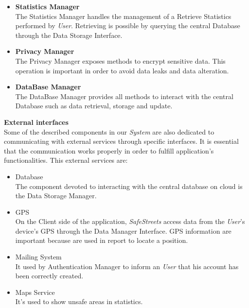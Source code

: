 \documentclass{article}
\begin{document}
\begin{itemize}
    \item \textbf{Statistics Manager} \\
    The Statistics Manager handles the management of a Retrieve Statistics performed by \textit{User}. Retrieving 
    is possible by querying the central Database through the Data Storage Interface.     
    \item \textbf{Privacy Manager} \\
    The Privacy Manager exposes methods to encrypt sensitive data. This operation is important in order to avoid data leaks
    and data alteration.
    \item \textbf{DataBase Manager} \\
    The DataBase Manager provides all methods to interact with the central Database such as data retrieval, 
    storage and update.
    
\end{itemize}

\textbf{External interfaces} \\
Some of the described components in our \textit{System} are also dedicated to communicating with external services through 
specific interfaces. It is essential that the communication works properly in order to fulfill application's functionalities.
This external services are:
\begin{itemize}
    \item Database \\
    The component devoted to interacting with the central database on cloud is the Data Storage Manager.
    \item GPS \\
    On the Client side of the application, \textit{SafeStreets} access data from the \textit{User}'s device's GPS through
    the Data Manager Interface. GPS information are important because are used in report to locate a position. 
    \item Mailing System \\
    It used by Authentication Manager to inform an \textit{User} that his account has been correctly created. 
    \item Maps Service \\ 
    It's used to show unsafe areas in statistics.  
\end{itemize} 
\end{document}
